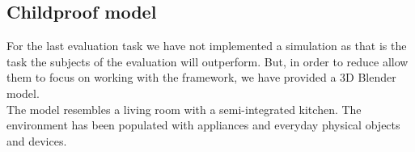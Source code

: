 \subsection{Childproof model} %
\label{subsec:impl_childproof_model}
For the last evaluation task we have not implemented a simulation as that is the task the subjects of the evaluation will outperform. But, in order to reduce allow them to focus on working with the framework, we have provided a 3D Blender model.\\

The model resembles a living room with a semi-integrated kitchen. The environment has been populated with appliances and everyday physical objects and devices.

